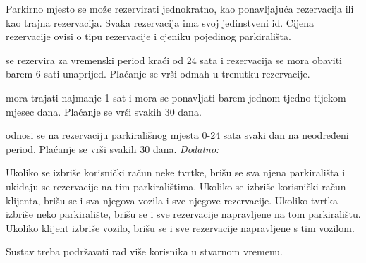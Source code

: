 Parkirno mjesto se može rezervirati jednokratno, kao ponavljajuća rezervacija ili kao trajna rezervacija. Svaka rezervacija ima svoj jedinstveni id. Cijena rezervacije ovisi o tipu rezervacije i cjeniku pojedinog parkirališta.

\textit{} se rezervira za vremenski period kraći od 24 sata i rezervacija se mora obaviti barem 6 sati unaprijed. Plaćanje se vrši odmah u trenutku rezervacije.

\textit{} mora trajati najmanje 1 sat i mora se ponavljati barem jednom tjedno tijekom mjesec dana. Plaćanje se vrši svakih 30 dana.

\textit{} odnosi se na rezervaciju parkirališnog mjesta 0-24 sata svaki dan na neodređeni period. Plaćanje se vrši svakih 30 dana.
\newline
\newline
\textit{Dodatno:}

Ukoliko se izbriše korisnički račun neke tvrtke, brišu se sva njena parkirališta i ukidaju se rezervacije na tim parkiralištima. Ukoliko se izbriše korisnički račun klijenta, brišu se i sva njegova vozila i sve njegove rezervacije. Ukoliko tvrtka izbriše neko parkiralište, brišu se i sve rezervacije napravljene na tom parkiralištu.
Ukoliko klijent izbriše vozilo, brišu se i sve rezervacije napravljene s tim vozilom.

Sustav treba podržavati rad više korisnika u stvarnom vremenu.
